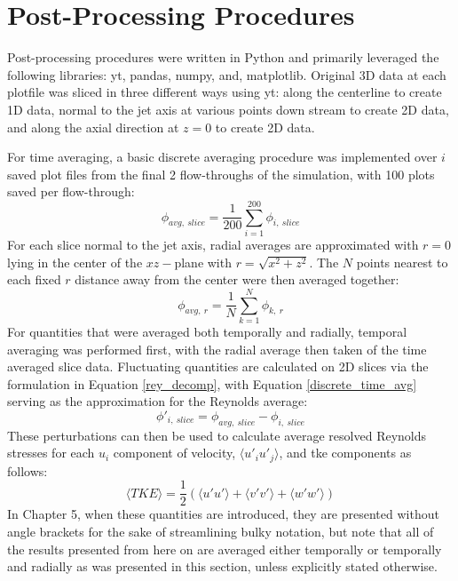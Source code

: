 \section{Post-Processing Procedures}
Post-processing procedures were written in Python and primarily leveraged the following libraries: yt, pandas, numpy, and, matplotlib. Original 3D data at each plotfile was sliced in three different ways using yt: along the centerline to create 1D data, normal to the jet axis at various points down stream to create 2D data, and along the axial direction at $z=0$ to create 2D data. 

For time averaging, a basic discrete averaging procedure was implemented over $i$ saved plot files from the final 2 flow-throughs of the simulation, with 100 plots saved per flow-through:
\begin{equation} \label{discrete_time_avg}
\phi_{avg,\ slice} = \dfrac{1}{200} \sum\limits_{i=1}^{200} \phi_{i,\ slice}
\end{equation}
For each slice normal to the jet axis, radial averages are approximated with $r = 0$ lying in the center of the $xz-$plane with $r = \sqrt{x^2 + z^2}$. The $N$ points nearest to each fixed $r$ distance away from the center were then averaged together:
\begin{equation} \label{discrete_time_avg}
\phi_{avg,\ r} = \dfrac{1}{N} \sum\limits_{k=1}^{N} \phi_{k,\ r}
\end{equation}
For quantities that were averaged both temporally and radially, temporal averaging was performed first, with the radial average then taken of the time averaged slice data. Fluctuating quantities are calculated on 2D slices via the formulation in Equation \ref{rey_decomp}, with Equation \ref{discrete_time_avg} serving as the approximation for the Reynolds average:
\begin{equation} \label{discrete_rey_decomp}
\phi'_{i,\ slice} = \phi_{avg,\ slice} - \phi_{i,\ slice}
\end{equation}
These perturbations can then be used to calculate average resolved Reynolds stresses for each $u_i$ component of velocity, $\langle u'_i u'_j \rangle$, and \gls{tke} components \cite{iso_comp_2} as follows: 
\begin{equation} \label{TKE}
\langle TKE \rangle = \dfrac{1}{2} \left( \langle u' u' \rangle + \langle v' v' \rangle + \langle w' w' \rangle  \right)
\end{equation}
In Chapter 5, when these quantities are introduced, they are presented without angle brackets for the sake of streamlining bulky notation, but note that all of the results presented from here on are averaged either temporally or temporally and radially as was presented in this section, unless explicitly stated otherwise. 

